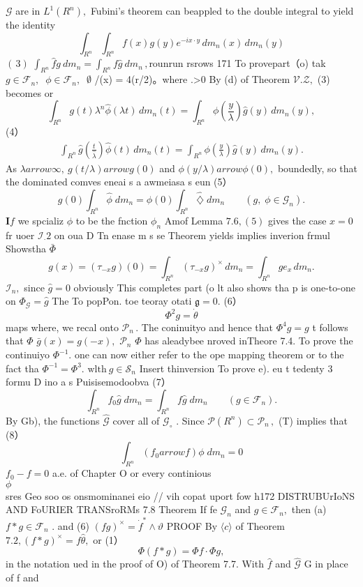 $\scriptstyle{\mathcal{G}}$ are in $L^{1}(R^{n}),$ Fubini's theorem can beappled to the double integral to yield the identity $$ \int_{R^{n}}\int_{R^{n}}f(x)g(y)e^{-i x\cdot y}\,d m_{n}(x)\,d m_{n}(y) $$ $(\,3)$ $\int_{R^{n}}\widehat{f}g\ d m_{n}=\int_{R^{n}}f\widehat{g}\ d m_{n}\,,$rounrun rsrows 171 To provepart（o) tak $g\in{\mathcal{F}}_{n},\;\;\phi\in{\mathcal{F}}_{n},\;\;\emptyset$ /(x) = 4(r/2)。where .>0 By (d) of Theorem ${\mathcal{V}}.{\mathcal{Z}},$ (3) becomes or $$ \int_{R^{n}}\!g(t)\lambda^{n}\hat{\phi}(\lambda t)\,d m_{n}(t)=\int_{R^{n}}\!\phi\!\left(\frac{y}{\lambda}\right)\hat{g}(y)\,d m_{n}(y), $$ (4） $$ \begin{array}{c}{{\int_{R^{n}}\hat{g}\left(\frac{t}{\hat{\lambda}}\right)\hat{\phi}(t)\,d m_{n}(t)=\int_{R^{n}}\phi\left(\frac{y}{\lambda}\right)\hat{g}(y)\,d m_{n}(y).}}\end{array} $$ As $\lambda arrow\infty,\ g(t/\lambda) arrow g(0)$ and $\phi(y/\lambda) arrow\phi(0),$ boundedly, so that the dominated comves eneai s a awmeiasa s eun (5） $$ g(0)\int_{R^{n}}\hat{\phi}\;d m_{n}=\phi(0)\int_{R^{n}}\hat{\diamondsuit}\;d m_{n}\qquad(g,\;\phi\in\mathcal{G}_{n}). $$ $\mathbf{I}f$ we spcializ $\phi$ to be the fnction $\phi_{n}$ Amof Lemma $7.6,(5)$ gives the case $x=0$ fr uoer ${\mathcal{I}}_{\cdot}2$ on oua D Tn enase m s se Theorem yields implies inverion frmul Showstha $\bar{\Phi}$ $$ g(x)=(\tau_{-x}g)(0)=\int_{R^{n}}(\tau_{-x}g)^{\times}\,d m_{n}=\int_{R^{n}}\!\!\!\hat{g}e_{x}\,d m_{n}. $$ ${\mathcal{I}}_{n},$ since $\scriptstyle{\hat{g}}=0$ obviously This completes part (o lt also shows tha p is one-to-one on $\Phi_{\mathcal{G}}={\hat{g}}$ The To popPon. toe teoray otati ${\mathfrak{g}}=0.$ (6） $$ \Phi^{2}g={\dot{\theta}} $$ maps where, we recal onto ${\mathcal{P}}_{n}\,.$ The coninuityo and hence that $\Phi^{4}g=g$ t follows that $\Phi$ ${\bar{g}}(x)=g(-x),$ ${\mathcal{P}}_{n}$ $\Phi$ has aleadybee nroved inTheore 7.4. To prove the continuiyo $\Phi^{-1}.$ one can now either refer to the ope mapping theorem or to the fact tha $\Phi^{-1}=\Phi^{3}.$ $\mathrm{wlth}\ g\in{\mathcal{S}}_{n}$ Insert thinversion To prove e). eu t tedenty 3 formu D ino a s Puisisemodoobva (7） $$ \int_{R^{n}}f_{0}\hat{g}\;d m_{n}=\int_{R^{n}}f\hat{g}\;d m_{n}\quad\quad(g\in{\mathcal{F}}_{n}). $$ By Gb), the functions $\hat{\mathcal{G}}$ cover all of $\scriptstyle{\mathcal{G}}_{\circ}$ . Since ${\mathcal{P}}(R^{n})\subset{\mathcal{P}}_{n}\,,$ (T) implies that (8） $$ \int_{R^{n}}(f_{0} arrow f)\phi\;d m_{n}=0 $$ $f_{0}-f=0$ a.e. of Chapter O or every continious $\phi~~~~~~~~~~~~~~~~~~~~~~~~~~~~~~~~~~~~~~~~~~~~~~~~~~~~~~~~~~~~~~~~~~~~~~~~~~~~~~~~~~~~~~~~~~~~~~~~~~~~~~~~~~~~~~~~~~~~~~~~~~~~~~~~~~~~~~~~~~~~~~~~~~~~~~~~~~~~~~~~~~~~~~~~~~~~~~~~~~~~~~~~~~~~~~~~~~~~~~~~~~~$ sres Geo soo os onsmominanei eio // vih copat uport fow h172 DISTRUBUrIoNS AND FoURIER TRANSroRMs 7.8 Theorem If fe ${\mathcal{G}}_{n}$ and $g\in{\mathcal{F}}_{n},$ then (a) $f*g\in{\mathcal{F}}_{n}$ . and (6) $(f g)^{\times}={\dot{f}}^{\ast}\wedge\vartheta$ PROOF By $\scriptstyle\langle c\rangle$ of Theorem $7.2,(f*g)^{\times}=f\hat{\theta},$ or (1） $$ \Phi(f*g)=\Phi f\cdot\Phi g, $$ in the notation ued in the proof of O) of Theorem 7.7. With $\hat{f}$ and $\hat{\mathcal{G}}$ G in place of f and 